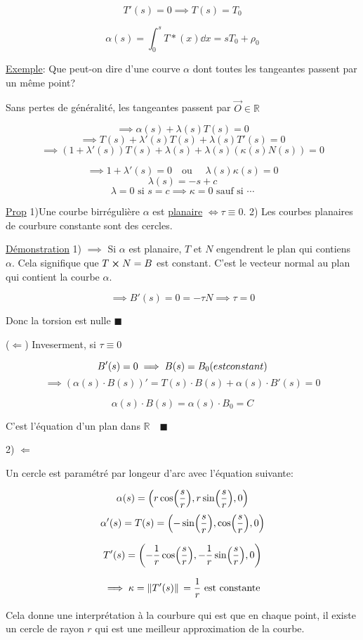 \documentclass{article}
\begin{document}
$$T'(s)=0 \implies T(s) = T_0$$

$$\alpha(s) = \int_0^sT*(x)\dd x = sT_0 + \rho_0$$

\underline{Exemple}: Que peut-on dire d'une courve $\alpha$ dont toutes les tangeantes passent par un même point?

Sans pertes de généralité, les tangeantes passent par $\vec O \in \mathbb{R}$

$$\implies \alpha(s) + \lambda(s)T(s) = 0$$
$$\implies T(s) + \lambda'(s)T(s) + \lambda(s)T'(s) =0$$
$$\implies (1 + \lambda'(s))T(s) + \lambda(s) + \lambda(s)(\kappa(s)N(s)) =0$$

$$\implies 1+\lambda'(s)=0 \quad \text{ou } \quad \lambda(s)\kappa(s) = 0$$
$$\lambda(s) = -s +c$$
$$\lambda =0 \text{ si } s=c \implies \kappa = 0 \text{ sauf si } \dotsb$$

\underline{Prop} 1)Une courbe birrégulière $\alpha$ est \underline{planaire} $\iff \tau \equiv 0$. 2) Les courbes planaires de courbure constante sont des cercles.

\underline{Démonstration} 1) $\implies$ Si $\alpha$ est planaire, $T$ et $N$ engendrent le plan qui contiens $\alpha$. Cela signifique que $T\cross N=B$ est constant. C'est le vecteur normal au plan qui contient la courbe $\alpha$.

$$\implies B'(s)=0=-\tau N \implies \tau = 0$$

Donc la torsion est nulle $\blacksquare$

($\Longleftarrow$) Inveserment, si $\tau \equiv0$

$$B'(s) = 0 \implies B(s) =B_0 \text (est constant)$$
$$\implies (\alpha(s)\cdot B(s))' = T(s)\cdot B(s) + \alpha(s)\cdot B'(s) =0$$

$$\alpha(s)\cdot B(s) =\alpha(s)\cdot B_0 = C$$

C'est l'équation d'un plan dans $\mathbb{R}\quad \blacksquare$

2) $\Longleftarrow$

Un cercle est paramétré par longeur d'arc avec l'équation suivante:

$$\alpha(s) = \qty(r\cos(\frac sr), r\sin(\frac sr),0)$$
$$\alpha'(s) = T(s)=\qty(-\sin(\frac sr), \cos(\frac sr), 0)$$

$$T'(s)=\qty(-\frac 1r\cos(\frac sr), -\frac 1r\sin(\frac sr), 0)$$

$$\implies \kappa = \norm*{T'(s)} = \frac 1r \text{ est constante}$$

Cela donne une interprétation à la courbure qui est que en chaque point, il existe un cercle de rayon $r$ qui est une meilleur approximation de la courbe.
\end{document}
